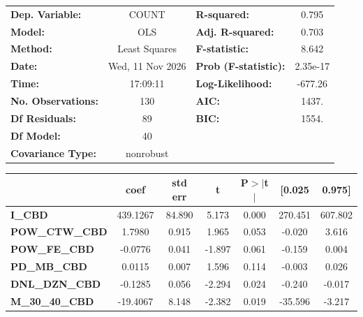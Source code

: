 \begin{center}
\begin{tabular}{lclc}
\toprule
\textbf{Dep. Variable:}    &      COUNT       & \textbf{  R-squared:         } &     0.795   \\
\textbf{Model:}            &       OLS        & \textbf{  Adj. R-squared:    } &     0.703   \\
\textbf{Method:}           &  Least Squares   & \textbf{  F-statistic:       } &     8.642   \\
\textbf{Date:}             & Wed, 11 Nov 2026 & \textbf{  Prob (F-statistic):} &  2.35e-17   \\
\textbf{Time:}             &     17:09:11     & \textbf{  Log-Likelihood:    } &   -677.26   \\
\textbf{No. Observations:} &         130      & \textbf{  AIC:               } &     1437.   \\
\textbf{Df Residuals:}     &          89      & \textbf{  BIC:               } &     1554.   \\
\textbf{Df Model:}         &          40      & \textbf{                     } &             \\
\textbf{Covariance Type:}  &    nonrobust     & \textbf{                     } &             \\
\bottomrule
\end{tabular}
\begin{tabular}{lcccccc}
                         & \textbf{coef} & \textbf{std err} & \textbf{t} & \textbf{P$> |$t$|$} & \textbf{[0.025} & \textbf{0.975]}  \\
\midrule
\textbf{I\_CBD}          &     439.1267  &       84.890     &     5.173  &         0.000        &      270.451    &      607.802     \\
\textbf{POW\_CTW\_CBD}   &       1.7980  &        0.915     &     1.965  &         0.053        &       -0.020    &        3.616     \\
\textbf{POW\_FE\_CBD}    &      -0.0776  &        0.041     &    -1.897  &         0.061        &       -0.159    &        0.004     \\
\textbf{PD\_MB\_CBD}     &       0.0115  &        0.007     &     1.596  &         0.114        &       -0.003    &        0.026     \\
\textbf{DNL\_DZN\_CBD}   &      -0.1285  &        0.056     &    -2.294  &         0.024        &       -0.240    &       -0.017     \\
\textbf{M\_30\_40\_CBD}  &     -19.4067  &        8.148     &    -2.382  &         0.019        &      -35.596    &       -3.217     \\

\end{tabular}
\end{center}
